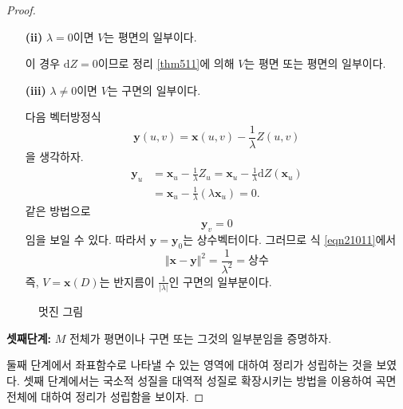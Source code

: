 \begin{proof}
\begin{itemize}
\item[\textbf{(ii)}] $\lambda  = 0$이면 $V$는 평면의 일부이다.

이 경우 $\mathrm{d}Z = 0$이므로 정리 \ref{thm511}에 의해 $V$는 평면 또는 평면의
일부이다.

\item[\textbf{(iii)}] $\lambda \ne 0$이면 $V$는 구면의 일부이다.

다음 벡터방정식
\begin{equation}
\mathbf{y}(u, v) = \mathbf{x}(u, v) - \frac{1}{\lambda} Z(u, v)\label{eqn21011}
\end{equation}
을 생각하자.
\begin{align}
\mathbf{y}_u &= \mathbf{x}_u - \frac{1}{\lambda} Z_u
= \mathbf{x}_u - \frac{1}{\lambda} \mathrm{d}Z(\mathbf{x}_u)\\
&= \mathbf{x}_u - \frac{1}{\lambda}\left(\lambda \mathbf{x}_u \right) =0.
\end{align}
같은 방법으로
\[
\mathbf{y}_v = 0
\]
임을 보일 수 있다. 따라서 $\mathbf{y} = \mathbf{y}_0$는 상수벡터이다.
그러므로 식 \eqref{eqn21011}에서
\[
\Vert  \mathbf{x} - \mathbf{y}\Vert^2 = \frac{1}{\lambda^2} = \text{상수}
\]
즉, $V = \mathbf{x}(D)$는 반지름이 $\displaystyle{\frac{1}{|\lambda|}}$인
구면의 일부분이다.
\end{itemize}


\begin{figure}
\caption{멋진 그림}\label{fig:wonderful_figure}
\end{figure}


\textbf{셋째단계:} $M$ 전체가 평면이나 구면 또는 그것의 일부분임을 증명하자.

둘째 단계에서 좌표함수로 나타낼 수 있는 영역에 대하여 정리가 성립하는 것을
보였다. 셋째 단계에서는 국소적 성질을 대역적 성질로 확장시키는 방법을 이용하여
곡면 전체에 대하여 정리가 성립함을 보이자.


\end{proof}
